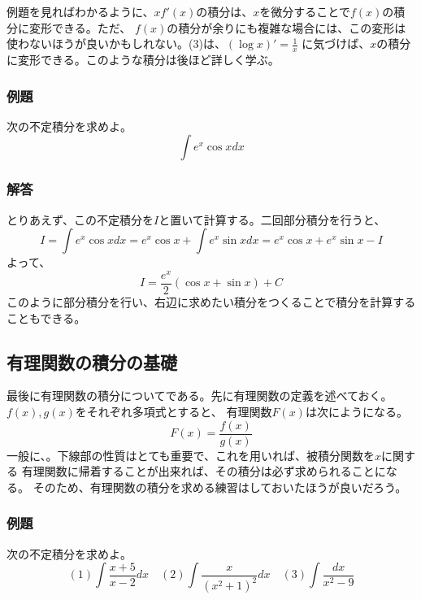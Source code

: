 \documentclass[a4j,dvipdfmx]{jsarticle}
\begin{document}
例題を見ればわかるように、$xf'(x)$の積分は、$x$を微分することで$f(x)$の積分に変形できる。ただ、
$f(x)$の積分が余りにも複雑な場合には、この変形は使わないほうが良いかもしれない。(3)は、$(\log x)'=\frac{1}{x}$
に気づけば、$x$の積分に変形できる。このような積分は後ほど詳しく学ぶ。
\subsubsection{例題}
次の不定積分を求めよ。
\begin{equation*}
    \int e^x \cos xdx
\end{equation*}
\subsubsection*{解答}

とりあえず、この不定積分を$I$と置いて計算する。二回部分積分を行うと、
\begin{equation*}
    I=\int e^x \cos xdx=e^x\cos x + \int e^x \sin xdx=e^x\cos x+e^x \sin x-I 
\end{equation*}
よって、
\begin{equation*}
    I=\frac{e^x}{2}(\cos x+\sin x)+C
\end{equation*}
このように部分積分を行い、右辺に求めたい積分をつくることで積分を計算することもできる。
\newpage
\subsection{有理関数の積分の基礎}
最後に有理関数の積分についてである。先に有理関数の定義を述べておく。$f(x),g(x)$をそれぞれ多項式とすると、
有理関数$F(x)$は次にようになる。
\begin{equation*}
    F(x)=\frac{f(x)}{g(x)}
\end{equation*}
一般に、。下線部の性質はとても重要で、これを用いれば、被積分関数を$x$に関する
有理関数に帰着することが出来れば、その積分は必ず求められることになる。
そのため、有理関数の積分を求める練習はしておいたほうが良いだろう。
\subsubsection{例題}
次の不定積分を求めよ。
\begin{equation*}
    (1)\int \frac{x+5}{x-2}dx\quad(2)\int \frac{x}{(x^2+1)^2}dx\quad(3)\int \frac{dx}{x^2-9}
\end{equation*}
\end{document}
